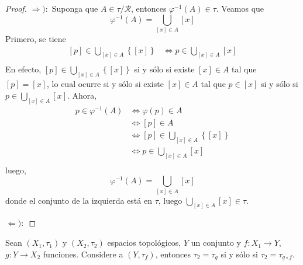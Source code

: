 \documentclass[12pt]{report}
\theoremstyle{largebreak}
\newcommand\cf[3]{\ensuremath{#1:#2\rightarrow#3}}
\begin{document}
    \begin{proof}
        $\Rightarrow):$ Suponga que $A\in\tau/\mathcal{R}$, entonces $\varphi^{-1}(A)\in\tau$. Veamos que
        \begin{equation*}
            \varphi^{-1}(A)=\bigcup_{ [x]\in A}[x]
        \end{equation*}
        Primero, se tiene
        \begin{equation*}
            \begin{split}
                [p]\in\bigcup_{ [x]\in A}\left\{[x]\right\}&\iff p\in\bigcup_{ [x]\in A}[x]\\
            \end{split}
        \end{equation*}
        En efecto, $[p]\in\bigcup_{ [x]\in A}\left\{[x]\right\}$ si y sólo si existe $[x]\in A$ tal que $[p]=[x]$, lo cual ocurre si y sólo si existe $[x]\in A$ tal que $p\in[x]$ si y sólo si $p\in\bigcup_{ [x]\in A}[x]$.
        Ahora,
        \begin{equation*}
            \begin{split}
                p\in\varphi^{-1}(A)&\iff \varphi(p)\in A\\
                &\iff [p]\in A\\
                &\iff [p]\in\bigcup_{ [x]\in A}\left\{[x]\right\}\\
                &\iff p\in\bigcup_{ [x]\in A}[x]\\
            \end{split}
        \end{equation*}
        luego, 
        \begin{equation*}
            \varphi^{-1}(A)=\bigcup_{ [x]\in A}[x]
        \end{equation*}
        donde el conjunto de la izquierda está en $\tau$, luego $\bigcup_{ [x]\in A}[x]\in\tau$. 

        $\Leftarrow):$%
    \end{proof}

    \begin{propo}
        Sean $(X_1,\tau_1)$ y $(X_2,\tau_2)$ espacios topológicos, $Y$ un conjunto y $\cf{f}{X_1}{Y}$, $\cf{g}{Y}{X_2}$ funciones. Considere a $(Y,\tau_f)$, entonces $\tau_2=\tau_g$ si y sólo si $\tau_2=\tau_{ g\circ f}$.
    \end{propo}
\end{document}
